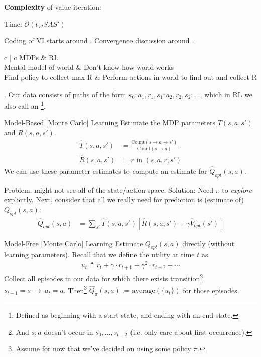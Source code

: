 \documentclass[11pt]{article}
\newcommand\myspace[1][]{\vspace{#1\bigskipamount}\Needspace{10\baselineskip}}
\begin{document}
\textbf{Complexity} of value iteration:
\begin{compactitem}
	\item Time: $\mathcal O (t_{VI} S A S' )$
\end{compactitem}
Coding of VI starts around . Convergence discussion around . 








\begin{table}{c | c}
		MDPs  & RL \\ \midrule \midrule 
	Mental model of world & Don't know how world works \\ \midrule
	Find policy to collect max R & Perform actions in world to find out and collect R \\
\end{table}


\myspace
{} . Our data consists of paths of the form $s_0; a_1, r_1, s_1; a_2, r_2, s_2; \ldots$, which in RL we also call an \footnote{Defined as beginning with a start state, and ending with an end state.}.

\begin{definition}{Model-Based [Monte Carlo]  Learning}
	Estimate the MDP \underline{parameters} $T(s, a, s')$ and $R(s, a, s')$. 
	\begin{align}
		\hat T(s, a, s')
			&= \frac{ \text{Count}(s \rightarrow a \rightarrow s')   }{ \text{Count}(s \rightarrow a)    } \\
		\hat R (s, a, s')
			&= r \text{ in } (s, a, r, s')
	\end{align}
	We can use these parameter estimates to compute an estimate for $\hat Q_{opt}(s, a)$. 
\end{definition}
Problem: might not see all of the state/action space. Solution: Need $\pi$ to \textit{explore} explicitly. Next, consider that all we really need for prediction is (estimate of) $Q_{opt}(s, a)$:
\begin{align}
	\hat Q_{opt}(s, a) 
		&= \sum_{s'} \hat T(s, a, s')\left[
			\hat R(s, a, s') + \gamma \hat V_{opt}(s')
		\right]
\end{align}
\begin{definition}{Model-Free [Monte Carlo] Learning}
	Estimate $Q_{opt}(s, a)$ directly (without learning parameters). Recall that we define the utility at time $t$ as
	\begin{align}
		u_t \triangleq r_t + \gamma \cdot r_{t + 1} + \gamma^2 \cdot r_{t+2} + \cdots 
	\end{align}
	Collect all episodes in our data for which there exists transition\footnote{And $s, a$ doesn't occur in $s_0, \ldots, s_{t-2}$ (i.e. only care about first occurrence).} $s_{t-1}{=}s ~\longrightarrow ~ a_t{=}a$. Then\footnote{Assume for now that we've decided on using some policy $\pi$.} $\hat Q_{\pi}(s, a) := \text{average}(\{u_t\})$ for those episodes. 
\end{definition}
\end{document}
